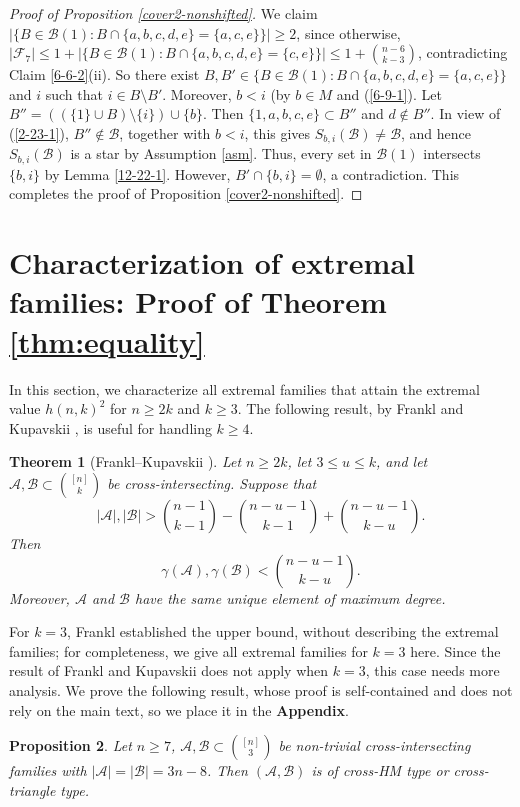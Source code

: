 \documentclass[a4paper,11pt]{article}
\newtheorem{theorem}{Theorem}[section]
\newtheorem{proposition}[theorem]{Proposition}
\newcommand{\m}{\mathcal}
\begin{document}
\begin{proof}[Proof of Proposition \ref{cover2-nonshifted}]
We claim 
$|\{B\in \m B(1): B\cap \{a,b,c,d,e\}=\{a,c,e\}\}|\ge 2$, since otherwise, 
$|\m F_7|\le 1+ |\{B\in \m B(1): B\cap \{a,b,c,d,e\}=\{c,e\}\}|\le 1+{n-6\choose k-3}$, contradicting Claim \ref{6-6-2}(ii).
So there exist $B, B'\in \{B\in \m B(1): B\cap \{a,b,c,d,e\}=\{a,c,e\}\}$ and $i$ such that $i\in B\setminus B'$. Moreover, $b<i$ (by $b\in M$ and (\ref{6-9-1}).
Let $B''=((\{1\}\cup B)\setminus \{i\})\cup \{b\}$. Then $\{1,a,b,c,e\}\subset B''$ and $d\not\in B''$. In view of (\ref{2-23-1}), $B''\not\in \m B$, together with $b<i$, this gives $S_{b,i}(\m B)\ne \m B$, and hence   
$S_{b,i}(\m B)$ is a star by
Assumption \ref{asm}. Thus, every set in $\m B(1)$ intersects $\{b,i\}$ by Lemma \ref{12-22-1}.  However, $B'\cap \{b,i\}=\emptyset$, a contradiction. 
This completes the proof of Proposition \ref{cover2-nonshifted}. 
\end{proof}


\section{Characterization of extremal families: Proof of Theorem \ref{thm:equality}}\label{sec:equality}
In this section, we characterize all extremal families that attain the
extremal value $h(n,k)^2$ for $n\ge 2k$ and $k\ge 3$. 
The following result, by Frankl and Kupavskii \cite{FK-diversity}, is useful for handling $k\ge 4$. 
\begin{theorem}[Frankl--Kupavskii \cite{FK-diversity}]
\label{FK-cross-diversity}
Let $n\ge2k$, let $3\le u\le k$, and let
$\m A,\m B\subset\binom{[n]}k$ be cross-intersecting.
Suppose that
\[
|\m A|,|\m B|
>
\binom{n-1}{k-1}
-\binom{n-u-1}{k-1}
+\binom{n-u-1}{k-u}.
\]
Then
\[
\gamma(\m A),\gamma(\m B)
<
\binom{n-u-1}{k-u}.
\]
Moreover, $\m A$ and $\m B$ have the same unique element of
maximum degree.
\end{theorem}

For $k=3$, Frankl \cite{11-6-2} established the upper bound, without describing the extremal families; for completeness, we give all extremal families for
$k=3$ here. Since the result of Frankl and Kupavskii does not apply when $k=3$, this case needs more analysis. We prove the following result, whose proof is self-contained and does not rely on the main text, so we place it in the {\bf Appendix}.

\begin{proposition}\label{end3}
Let $n\ge 7$, $\m A, \m B \subset {[n]\choose 3}$ be non-trivial cross-intersecting families with $|\m A|=|\m B|=3n-8$. Then $(\m A, \m B)$ is of cross-HM type or cross-triangle type.
\end{proposition}
\end{document}
